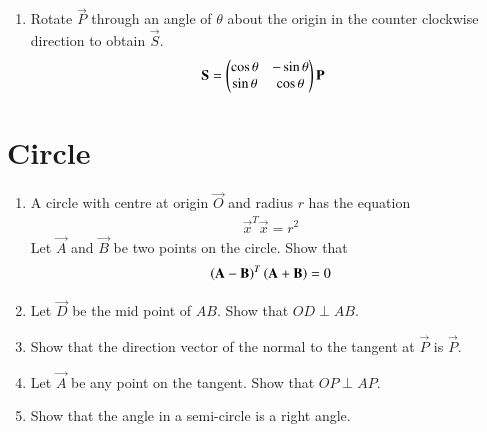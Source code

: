 \documentclass[journal,12pt,twocolumn]{IEEEtran}
\renewcommand\thesection{\arabic{section}}
\begin{document}
\begin{enumerate}[label=\thesection.\arabic*
,ref=\thesection.\theenumi]
with the condition that $\vec{m},\vec{n}$ are orthonormal,
\begin{align}
\label{eq:reflect_ortho}
\vec{V}^T\vec{V}=  \vec{I}
\end{align}
%
Noting that 
\begin{align}
\label{eq:reflect_trans}
\myvec{\vec{m} & -\vec{n}} &= \myvec{\vec{m} & \vec{n}} \myvec{1 & 0 \\ 0 & -1},
\end{align}
\eqref{eq:reflect_bisectQR} can be expressed as
%
\begin{align}
\label{eq:reflect_}
\vec{V}^T\vec{R} &=  \sbrak{\vec{V}\myvec{1 & 0 \\ 0 & -1}}^T\vec{P}+\myvec{0 \\ 2c}
\\
\implies \vec{R} &= \sbrak{\vec{V}\myvec{1 & 0 \\ 0 & -1}\vec{V}^{-1}}^T\vec{P}+ \vec{V}\myvec{0 \\ 2c}
\\
 &=\vec{V}\myvec{1 & 0 \\ 0 & -1}\vec{V}^T \vec{P}+2c \vec{n}
\end{align}

\item Rotate $\vec{P}$ through an angle of  $ \theta $  about the origin in the counter clockwise 
direction to obtain $\vec{S}$.
\\
\solution 
\begin{align}
\label{eq:rotate}
\mathbf{S} &= \begin{pmatrix}\cos \theta & -\sin \theta \\ \sin \theta & \cos \theta\end{pmatrix} \mathbf{P}
\end{align}


\end{enumerate}


\section{Circle}
\begin{enumerate}[label=\thesection.\arabic*
,ref=\thesection.\theenumi]
\item A circle with centre at origin $\vec{O}$ and radius $r$ has the equation 
\begin{align}
\vec{x}^T\vec{x} = r^2
\end{align}
Let $\vec{A}$ and $\vec{B}$ be two points on the circle.  Show that 
\begin{align}
\left(\mathbf{A}-\mathbf{B}\right)^T\left(\mathbf{A}+\mathbf{B}\right) = 0
\end{align}
\item Let  $\vec{D}$ be the mid point of $AB$.  Show that $OD \perp AB$.
\item Show that the direction vector of the normal to the tangent at $\vec{P}$ is $\vec{P}$.
\item Let $\vec{A}$ be any point on the tangent. Show that $OP \perp AP$.
\item Show that the angle in a semi-circle is a right angle.
\end{enumerate}
\end{document}
